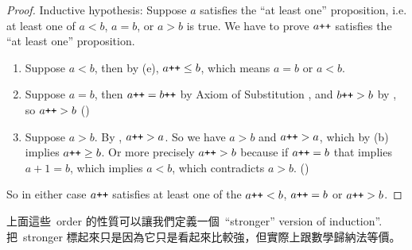 \begin{proof}
Inductive hypothesis: Suppose \(a\) satisfies the ``at least one'' proposition, i.e. at least one of \(a < b\), \(a = b\), or \(a > b\) is true. We have to prove \(a\texttt{++}\) satisfies the ``at least one'' proposition.
    \begin{enumerate}
        \item Suppose \(a < b\), then by (e), \(a\texttt{++} \leq b\), which means \(a = b\) or \(a < b\).
        \item Suppose \(a = b\), then \(a\texttt{++} = b\texttt{++}\) by Axiom of Substitution , and \(b\texttt{++} > b\) by , so \(a\texttt{++} > b\) ()
        \item Suppose \(a > b\). By , \(a\texttt{++} > a\). So we have \(a > b\) and \(a\texttt{++} > a\), which by (b) implies \(a\texttt{++} \geq b\). Or more precisely \(a\texttt{++} > b\) because if \(a\texttt{++} = b\) that implies \(a + 1 = b\), which implies \(a < b\), which contradicts \(a > b\). ()
    \end{enumerate}
So in either case \(a\texttt{++}\) satisfies at least one of the \(a\texttt{++} < b\), \(a\texttt{++} = b\) or \(a\texttt{++} > b\).
\end{proof}

\begin{note}
上面這些\ order 的性質可以讓我們定義一個\ ``stronger'' version of induction''. 把\ stronger 標起來只是因為它只是看起來比較強，但實際上跟數學歸納法等價。
\end{note}

